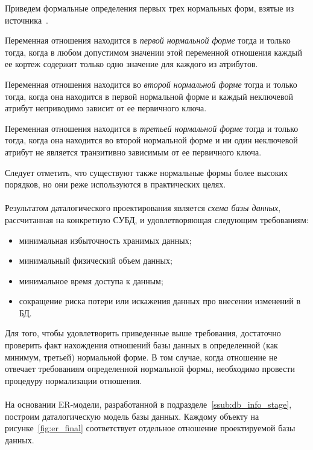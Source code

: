 Приведем формальные определения первых трех нормальных форм, 
взятые из источника~\cite{date05}. 

Переменная отношения находится в \textit{первой нормальной форме} тогда
и только тогда, когда в любом допустимом значении этой переменной отношения каждый
ее кортеж содержит только одно значение для каждого из атрибутов.

Переменная отношения находится во \textit{второй нормальной форме} тогда и только тогда,
когда она находится в первой нормальной форме и каждый неключевой атрибут
неприводимо зависит от ее первичного ключа.

Переменная отношения находится в \textit{третьей нормальной форме} тогда и только тогда,
когда она находится во второй нормальной форме и ни один неключевой атрибут не является
транзитивно зависимым от ее первичного ключа.

Следует отметить, что существуют также нормальные формы более высоких порядков,
но они реже используются в практических целях.  

\paragraph{}
Результатом даталогического проектирования является \textit{схема базы данных},
рассчитанная на конкретную СУБД, и удовлетворяющая следующим требованиям:
\begin{itemize}
  \item минимальная избыточность хранимых данных;
  \item минимальный физический объем данных;
  \item минимальное время доступа к данным;
  \item сокращение риска потери или искажения данных про внесении изменений в БД.
\end{itemize}

Для того, чтобы удовлетворить приведенные выше требования, достаточно проверить факт
нахождения отношений базы данных в определенной (как минимум, третьей) нормальной форме.
В том случае, когда отношение не отвечает требованиям определенной нормальной формы,
необходимо провести процедуру нормализации отношения.

\paragraph{}
На основании ER-модели, разработанной в подразделе~\ref{ssub:db_info_stage}, 
построим даталогическую модель базы данных.
Каждому объекту на рисунке~\ref{fig:er_final} соответствует отдельное отношение
проектируемой базы данных. 

